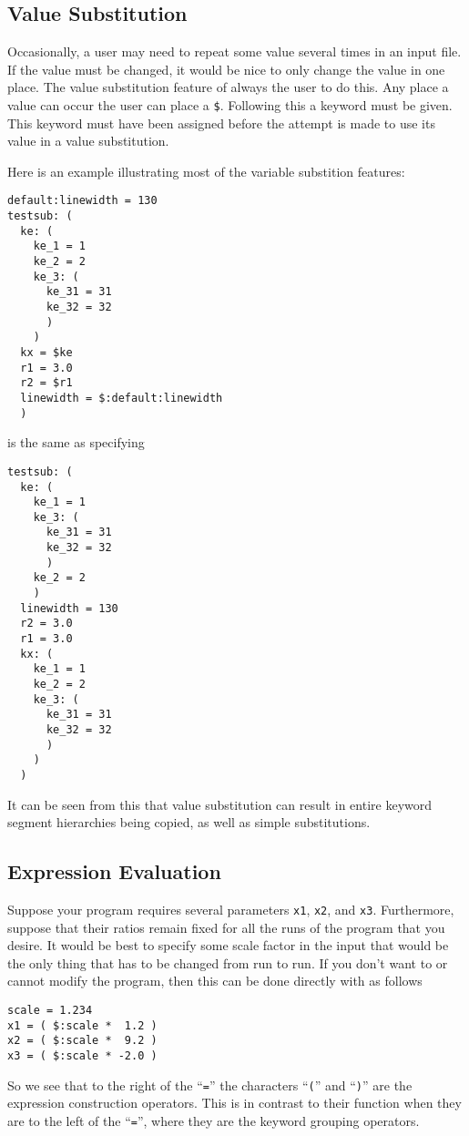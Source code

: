 \subsection{Value Substitution}
\label{ParsedKeyValvalsub}

Occasionally, a user may need to repeat some value several times in an
input file.  If the value must be changed, it would be nice to only
change the value in one place.  The value substitution feature of
 always the user to do this.  Any place a value can
occur the user can place a \verb|$|.  Following this a keyword must be
given.  This keyword must have been assigned before the attempt is made
to use its value in a value substitution.

Here is an example illustrating most of the variable substition
features:
\begin{verbatim}
default:linewidth = 130
testsub: (
  ke: (
    ke_1 = 1
    ke_2 = 2
    ke_3: (
      ke_31 = 31
      ke_32 = 32
      )
    )
  kx = $ke
  r1 = 3.0
  r2 = $r1
  linewidth = $:default:linewidth
  )
\end{verbatim}
is the same as specifying
\begin{verbatim}
testsub: (
  ke: (
    ke_1 = 1
    ke_3: (
      ke_31 = 31
      ke_32 = 32
      )
    ke_2 = 2
    )
  linewidth = 130
  r2 = 3.0
  r1 = 3.0
  kx: (
    ke_1 = 1
    ke_2 = 2
    ke_3: (
      ke_31 = 31
      ke_32 = 32
      )
    )
  )
\end{verbatim}
It can be seen from this that value substitution can result in entire
keyword segment hierarchies being copied, as well as simple
substitutions.


\subsection{Expression Evaluation}

Suppose your program requires several parameters \verb|x1|, \verb|x2|,
and \verb|x3|.  Furthermore, suppose that their ratios remain fixed for
all the runs of the program that you desire.  It would be best to
specify some scale factor in the input that would be the only thing that
has to be changed from run to run.  If you don't want to or cannot
modify the program, then this can be done directly with
 as follows
\begin{verbatim}
scale = 1.234
x1 = ( $:scale *  1.2 )
x2 = ( $:scale *  9.2 )
x3 = ( $:scale * -2.0 )
\end{verbatim}
So we see that to the right of the ``\verb|=|'' the characters
``\verb|(|'' and ``\verb|)|'' are the expression construction operators.
This is in contrast to their function when they are to the left of the
``\verb|=|'', where they are the keyword grouping operators.

